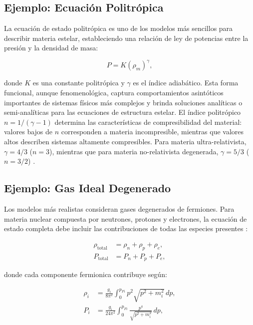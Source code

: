 \subsection{Ejemplo: Ecuación Politrópica}

La ecuación de estado politrópica es uno de los modelos más sencillos para describir materia estelar, estableciendo una relación de ley de potencias entre la presión y la densidad de masa:

\begin{equation}
	P = K (\rho_m)^{\gamma},
	\label{eq:eos_politropica}
\end{equation}

donde $K$ es una constante politrópica y $\gamma$ es el índice adiabático. Esta forma funcional, aunque fenomenológica, captura comportamientos asintóticos importantes de sistemas físicos más complejos y brinda soluciones analíticas o semi-analíticas para las ecuaciones de estructura estelar. El índice politrópico $n = 1/(\gamma - 1)$ determina las características de compresibilidad del material: valores bajos de $n$ corresponden a materia incompresible, mientras que valores altos describen sistemas altamente compresibles. Para materia ultra-relativista, $\gamma = 4/3$ ($n = 3$), mientras que para materia no-relativista degenerada, $\gamma = 5/3$ ($n = 3/2$) \cite{chandrasekharIntroductionStudyStellar1970}.

\subsection{Ejemplo: Gas Ideal Degenerado}
\label{sec:gasnpe}

Los modelos más realistas consideran gases degenerados de fermiones. Para materia nuclear compuesta por neutrones, protones y electrones, la ecuación de estado completa debe incluir las contribuciones de todas las especies presentes \cite{shapiroBlackHolesWhite2008}:

\begin{align}
	\rho_{\text{total}} &= \rho_n + \rho_p + \rho_e, \label{eq:densidad_total} \\
	P_{\text{total}} &= P_n + P_p + P_e, \label{eq:presion_total}
\end{align}

donde cada componente fermionica contribuye según:

\begin{align}
	\rho_i &= \frac{g_i}{8\pi^2} \int_0^{p_{Fi}} p^2\sqrt{p^2 + m_i^2} \, dp, \label{eq:densidad_fermi_general} \\
	P_i &= \frac{g_i}{24\pi^2} \int_0^{p_{Fi}} \frac{p^4}{\sqrt{p^2 + m_i^2}} \, dp, \label{eq:presion_fermi_general}
\end{align}

